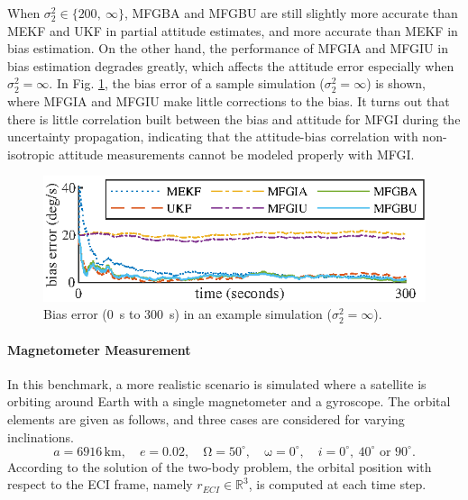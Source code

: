 When $\sigma_2^2 \in \{200,\ \infty\}$, MFGBA and MFGBU are still slightly more accurate than MEKF and UKF in partial attitude estimates, and more accurate than MEKF in bias estimation.
On the other hand, the performance of MFGIA and MFGIU in bias estimation degrades greatly, which affects the attitude error especially when $\sigma_2^2 = \infty$.
In Fig. \ref{fig:attEst-sim2-trajectory-bias}, the bias error of a sample simulation ($\sigma_2^2=\infty$) is shown, where MFGIA and MFGIU make little corrections to the bias.
It turns out that there is little correlation built between the bias and attitude for MFGI during the uncertainty propagation, indicating that the attitude-bias correlation with non-isotropic attitude measurements cannot be modeled properly with MFGI.

\begin{figure}
	\centering
	\includegraphics[scale=1.4]{figures/attEst-sim2-trajectory-bias}
	\caption{Bias error (\SI{0}{\second} to \SI{300}{\second}) in an example simulation ($\sigma_2^2=\infty$). \label{fig:attEst-sim2-trajectory-bias}}
\end{figure}

\paragraph{Magnetometer Measurement}

In this benchmark, a more realistic scenario is simulated where a satellite is orbiting around Earth with a single magnetometer and a gyroscope.
The orbital elements are given as follows, and three cases are considered for varying inclinations. 
\begin{equation*}
	a=6916\,\mathrm{km},\quad
	e=0.02,\quad
	\mathrm{\Omega} = 50^\circ,\quad
	\mathrm{\omega} = 0^\circ,\quad
	i = 0^\circ,\ 40^\circ \text{ or } 90^\circ.
\end{equation*}
According to the solution of the two-body problem, the orbital position with respect to the ECI frame, namely  $r_{ECI}\in\mathbb{R}^3$, is computed at each time step.

